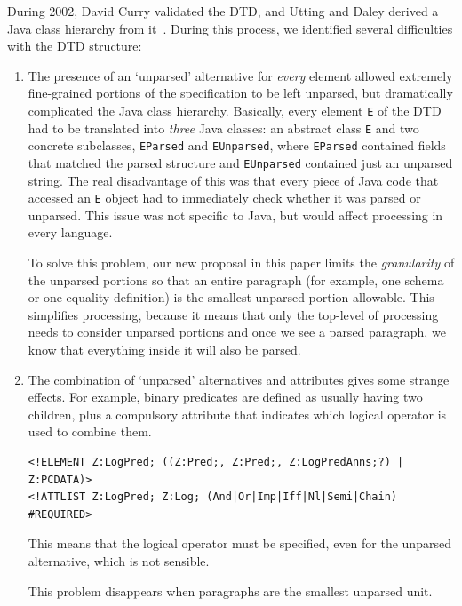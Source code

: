 \documentclass{llncs}  %
\begin{document}
During 2002, David Curry validated the DTD, and Utting and Daley
derived a Java class hierarchy from it~\cite{daley:report02}.
During this process, we identified several difficulties with the
DTD structure:

\begin{enumerate}
\item The presence of an `unparsed' alternative for \emph{every} element
  allowed extremely fine-grained portions of the specification to be left
  unparsed, but dramatically complicated the Java class hierarchy.
  Basically, every element \verb!E! of the DTD had to be translated into
  \emph{three} Java classes: an abstract class \verb!E! and two concrete 
  subclasses, \verb!EParsed! and \verb!EUnparsed!, where \verb!EParsed!
  contained fields that matched the parsed structure and \verb!EUnparsed!
  contained just an unparsed string.  The real disadvantage of this was
  that every piece of Java code that accessed an \verb!E! object had to
  immediately check whether it was parsed or unparsed.  This issue was not
  specific to Java, but would affect processing in every language.
  
  To solve this problem, our new proposal in this paper limits the
  \emph{granularity} of the unparsed portions so that an entire paragraph
  (for example, one schema or one equality definition) is the smallest
  unparsed portion allowable.  This simplifies processing, because it means
  that only the top-level of processing needs to consider unparsed portions
  and once we see a parsed paragraph, we know that everything inside it
  will also be parsed.

\item The combination of `unparsed' alternatives and attributes
  gives some strange effects.  For example, binary predicates are
  defined as usually having two children, plus a compulsory attribute
  that indicates which logical operator is used to combine them.
\begin{small}
\begin{verbatim}
<!ELEMENT Z:LogPred; ((Z:Pred;, Z:Pred;, Z:LogPredAnns;?) | Z:PCDATA)>
<!ATTLIST Z:LogPred; Z:Log; (And|Or|Imp|Iff|Nl|Semi|Chain) #REQUIRED>
\end{verbatim}
\end{small}
  This means that the logical operator must be specified,
  even for the unparsed alternative, which is not sensible. 

  This problem disappears when paragraphs are the smallest unparsed unit.


\end{enumerate}
\end{document}

